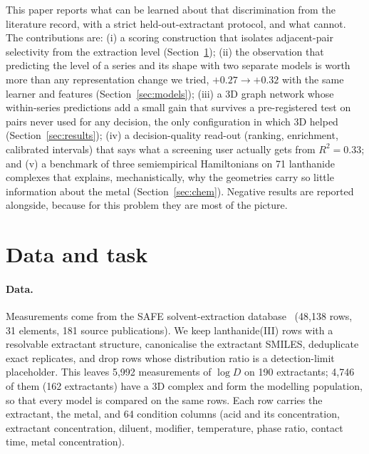 \documentclass{article}
\begin{document}
This paper reports what can be learned about that discrimination from the literature record, with a strict held-out-extractant protocol, and what cannot.
The contributions are:
(i) a scoring construction that isolates adjacent-pair selectivity from the extraction level (Section~\ref{sec:task});
(ii) the observation that predicting the level of a series and its shape with two separate models is worth more than any representation change we tried, $+0.27 \to +0.32$ with the same learner and features (Section~\ref{sec:models});
(iii) a 3D graph network whose within-series predictions add a small gain that survives a pre-registered test on pairs never used for any decision, the only configuration in which 3D helped (Section~\ref{sec:results});
(iv) a decision-quality read-out (ranking, enrichment, calibrated intervals) that says what a screening user actually gets from $R^2 = 0.33$; and
(v) a benchmark of three semiempirical Hamiltonians on 71 lanthanide complexes that explains, mechanistically, why the geometries carry so little information about the metal (Section~\ref{sec:chem}).
Negative results are reported alongside, because for this problem they are most of the picture.

\section{Data and task}
\label{sec:task}

\paragraph{Data.}
Measurements come from the SAFE solvent-extraction database~\cite{safe} (48{,}138 rows, 31 elements, 181 source publications).
We keep lanthanide(III) rows with a resolvable extractant structure, canonicalise the extractant SMILES, deduplicate exact replicates, and drop rows whose distribution ratio is a detection-limit placeholder.
This leaves 5{,}992 measurements of $\log D$ on 190 extractants; 4{,}746 of them (162 extractants) have a 3D complex and form the modelling population, so that every model is compared on the same rows.
Each row carries the extractant, the metal, and 64 condition columns (acid and its concentration, extractant concentration, diluent, modifier, temperature, phase ratio, contact time, metal concentration).
\end{document}
